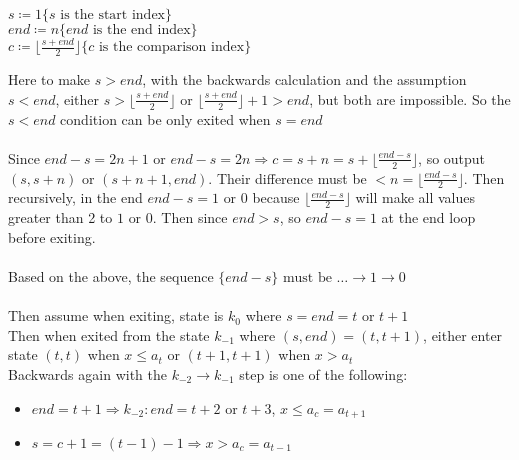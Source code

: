 \documentclass{article}
\newenvironment{SpacingAlgorithm}[2]{
    \par\addvspace{10pt}
    \begin{algorithm}[H]
        \setstretch{1.10}
        \caption{#1}\label{alg:#2}
}
{
    \end{algorithm}
    \vspace{10pt}
}
\newcommand{\mycmt}[1]{
    \{#1\}
}
\newcommand{\ProcTargetName}{test}
\newcommand{\CapProcTargetName}{\capitalisewords{\ProcTargetName}}
\newcommand{\CurTodolistToplevelIndex}{\number\numexpr\value{todolisti}\relax}
\begin{document}
\begin{todolist}[itemsep=0pt,parsep=0pt,start=3]
\begin{SpacingAlgorithm}{\CapProcTargetName}{\CurTodolistToplevelIndex}
        \(s\coloneqq 1\mycmt{s\text{ is the start index}}\)\\
        \(end\coloneqq n\mycmt{end\text{ is the end index}}\)\\
        \(c\coloneqq \lfloor\frac{s+end}{2}\rfloor\mycmt{c\text{ is the comparison index}}\)\\
    \end{SpacingAlgorithm}
    Here to make \(s>end\), with the backwards calculation and the assumption \(s<end\), either \(s>\lfloor\frac{s+end}{2}\rfloor\) or \(\lfloor\frac{s+end}{2}\rfloor+1>end\), but both are impossible.
    So the \(s<end\) condition can be only exited when \(s=end\)\\
    \\
    Since \(end-s=2n+1\text{ or }end-s=2n\Rightarrow c=s+n=s+\lfloor\frac{end-s}{2}\rfloor\), so output \((s,s+n)\text{ or }(s+n+1,end)\).
    Their difference must be \(<n=\lfloor\frac{end-s}{2}\rfloor\). Then recursively, in the end \(end-s=1\text{ or }0\)
    because \(\lfloor\frac{end-s}{2}\rfloor\) will make all values greater than 2 to \(1\text{ or }0\). Then since \(end>s\),
    so \(end-s=1\) at the end loop before exiting.\\
    \\
    Based on the above, the sequence \(\{end-s\}\text{ must be }\ldots\to 1\to 0\)\\
    \\
    Then assume when exiting, state is \(k_0\) where \(s=end=t\text{ or }t+1\)\\
    Then when exited from the state \(k_{-1}\) where \((s,end)=(t,t+1)\), either enter state \((t,t)\) when \(x\le a_t\) or \((t+1,t+1)\) when \(x> a_t\)\\
    Backwards again with the \(k_{-2}\to k_{-1}\) step is one of the following:
    \begin{itemize}
        \item \(end=t+1\Rightarrow k_{-2}:end=t+2\text{ or }t+3\), \(x\le a_{c}=a_{t+1}\)
        \item \(s=c+1=(t-1)-1\Rightarrow x>a_c=a_{t-1}\)
    \end{itemize}

\end{todolist}
\end{document}
